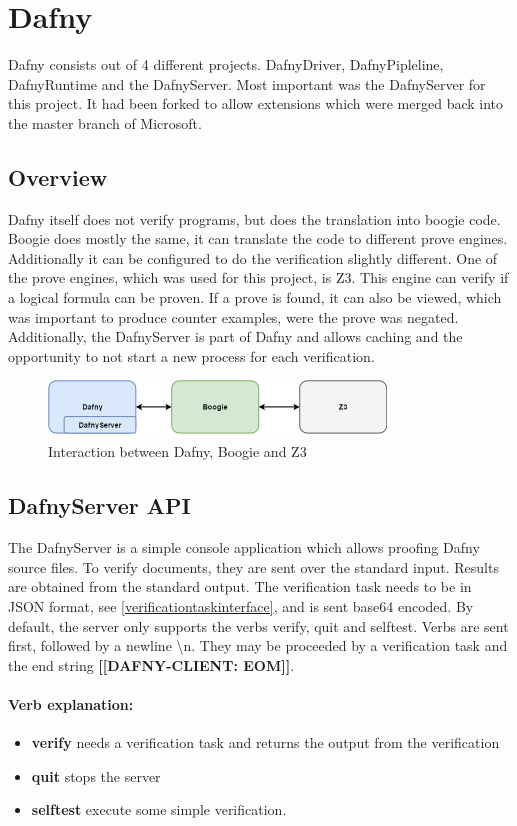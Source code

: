 \section{Dafny}
Dafny consists out of 4 different projects. DafnyDriver, DafnyPipleline, DafnyRuntime and the DafnyServer. Most important was the DafnyServer for this project. It had been forked to allow extensions which were merged back into the master branch of Microsoft. 
\subsection{Overview}
Dafny itself does not verify programs, but does the translation into boogie code. Boogie does mostly the same, it can translate the code to different prove engines. Additionally it can be configured to do the verification slightly different. One of the prove engines, which was used for this project, is Z3. This engine can verify if a logical formula can be proven. If a prove is found, it can also be viewed, which was important to produce counter examples, were the prove was negated. 
Additionally, the DafnyServer is part of Dafny and allows caching and the opportunity to not start a new process for each verification.\newline 
\begin{figure}[H]
	\centering
	\includegraphics[width=0.8\textwidth]{img/dafny_overview}
	\caption{Interaction between Dafny, Boogie and Z3}
	\label{fig:dafny_overview}
\end{figure}
\subsection{DafnyServer API}
The DafnyServer is a simple console application which allows proofing Dafny source files. To verify documents, they are sent over the standard input. Results are obtained from the standard output. The verification task needs to be in JSON format, see \ref{verificationtaskinterface}, and is sent base64 encoded. By default, the server only supports the verbs verify, quit and selftest. Verbs are sent first, followed by a newline \textbackslash{n}. They may be proceeded by a verification task and the end string \textbf{[[DAFNY-CLIENT: EOM]]}. 
\paragraph{Verb explanation:}
\begin{itemize}
	\item \textbf{verify} needs a verification task and returns the output from the verification
	\item \textbf{quit} stops the server
	\item \textbf{selftest} execute some simple verification.
\end{itemize}
